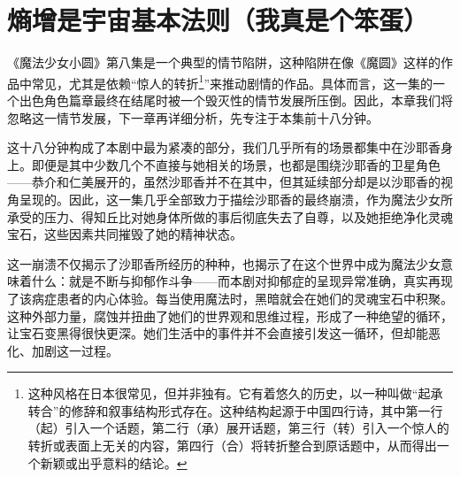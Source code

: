 \chapter[熵增是宇宙基本法则（我真是个笨蛋）]{熵增是宇宙基本法则\protect\footnotemark（我真是个笨蛋）}

《魔法少女小圆》第八集是一个典型的情节陷阱，这种陷阱在像《魔圆》这样的作品中常见，尤其是依赖“惊人的转折\footnote{这种风格在日本很常见，但并非独有。它有着悠久的历史，以一种叫做“起承转合”的修辞和叙事结构形式存在。这种结构起源于中国四行诗，其中第一行（起）引入一个话题，第二行（承）展开话题，第三行（转）引入一个惊人的转折或表面上无关的内容，第四行（合）将转折整合到原话题中，从而得出一个新颖或出乎意料的结论。}\cite{ref43}”来推动剧情的作品。具体而言，这一集的一个出色角色篇章最终在结尾时被一个毁灭性的情节发展所压倒。因此，本章我们将忽略这一情节发展，下一章再详细分析，先专注于本集前十八分钟。

这十八分钟构成了本剧中最为紧凑的部分，我们几乎所有的场景都集中在沙耶香身上。即便是其中少数几个不直接与她相关的场景，也都是围绕沙耶香的卫星角色——恭介和仁美展开的，虽然沙耶香并不在其中，但其延续部分却是以沙耶香的视角呈现的。因此，这一集几乎全部致力于描绘沙耶香的最终崩溃，作为魔法少女所承受的压力、得知丘比对她身体所做的事后彻底失去了自尊，以及她拒绝净化灵魂宝石，这些因素共同摧毁了她的精神状态。

这一崩溃不仅揭示了沙耶香所经历的种种，也揭示了在这个世界中成为魔法少女意味着什么：就是不断与抑郁作斗争——而本剧对抑郁症的呈现异常准确，真实再现了该病症患者的内心体验。每当使用魔法时，黑暗就会在她们的灵魂宝石中积聚。这种外部力量，腐蚀并扭曲了她们的世界观和思维过程，形成了一种绝望的循环，让宝石变黑得很快更深。她们生活中的事件并不会直接引发这一循环，但却能恶化、加剧这一过程\cite{ref44}。

